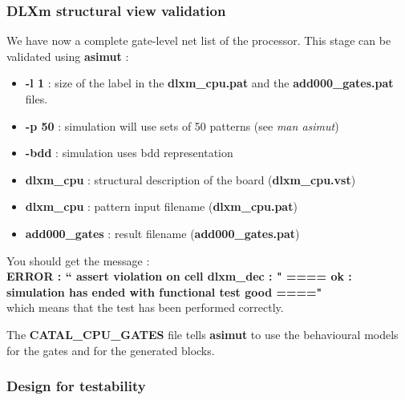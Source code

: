 		
		\subsubsection{DLXm structural view validation}


We have now a complete gate-level net list of the processor.
This stage can be validated using {\bf asimut} :


\begin{itemize} 
\item
{\bf -l 1} : size of the label in the {\bf dlxm\_cpu.pat} and the {\bf
add000\_gates.pat} files.
\item 
{\bf -p 50} : simulation will use sets of 50 patterns (see {\it man
asimut})
\item
{\bf -bdd} : simulation uses bdd representation
\item
{\bf dlxm\_cpu} : structural description of the board  ({\bf dlxm\_cpu.vst}) 
\item
{\bf dlxm\_cpu} : pattern input filename ({\bf dlxm\_cpu.pat}) 
\item
{\bf add000\_gates} : result filename ({\bf add000\_gates.pat}) 
\end{itemize}

You should get the message : \\
{\bf ERROR : `` assert violation on cell dlxm\_dec : " ==== ok :
simulation has ended with functional test good ===="}\\
which means that the test has been performed correctly.

The {\bf CATAL\_CPU\_GATES} file tells {\bf asimut} to use the
behavioural models for the gates and for the generated blocks.


		\subsubsection{Design for testability}

